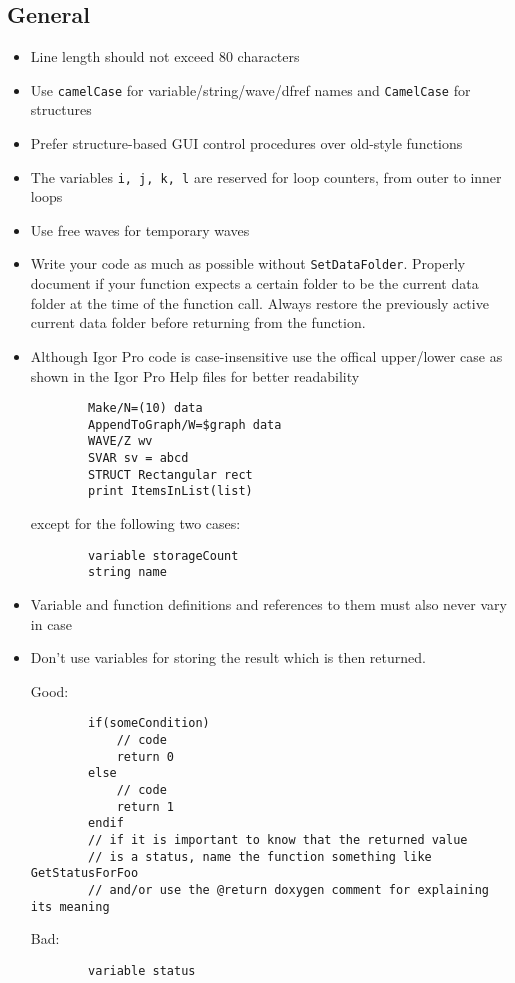 \documentclass{scrartcl}
\begin{document}
\subsection{General}
%
\begin{itemize}
	\item Line length should not exceed 80 characters
%	
	\item Use \texttt{camelCase} for variable/string/wave/dfref names and \texttt{CamelCase} for structures
%	
	\item Prefer structure-based GUI control procedures over old-style functions
%	
	\item The variables \texttt{i, j, k, l} are reserved for loop counters, from outer to inner loops
%	
	\item Use free waves for temporary waves
%	
	\item Write your code as much as possible without \texttt{SetDataFolder}. Properly document if your function expects 
	      a certain folder to be the current data folder at the time of the function call. Always restore the previously active current data folder
	      before returning from the function.
%	      
	\item Although Igor Pro code is case-insensitive use the offical upper/lower case as shown in the Igor Pro Help files for better readability
	\begin{verbatim}
		Make/N=(10) data
		AppendToGraph/W=$graph data
		WAVE/Z wv
		SVAR sv = abcd
		STRUCT Rectangular rect
		print ItemsInList(list)
	\end{verbatim}
	except for the following two cases:
	\begin{verbatim}
		variable storageCount
		string name
	\end{verbatim}
%
	\item Variable and function definitions and references to them must also never vary in case
%
	\item Don't use variables for storing the result which is then returned.\par
	Good: 
	\begin{verbatim}
		if(someCondition)
			// code
			return 0
		else
			// code
			return 1
		endif
		// if it is important to know that the returned value
		// is a status, name the function something like GetStatusForFoo 
		// and/or use the @return doxygen comment for explaining its meaning
	\end{verbatim}
	\begin{minipage}{\textwidth}
	Bad: 
	\begin{verbatim}
		variable status
		

\end{verbatim}
\end{minipage}
\end{itemize}
\end{document}
